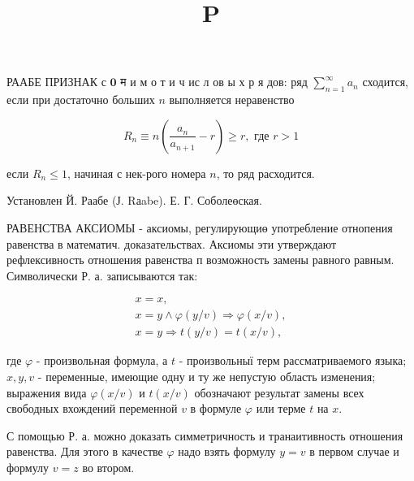 \documentclass[10pt]{article}
\title{$\mathbf{P}$ }
\author{}
\date{}
\begin{document}
\maketitle

РААБЕ ПРИЗНАК с $\mathbf{0}$ म и м о т и ч ис л ов ы х р я дов: ряд $\sum_{n=1}^{\infty} a_{n}$ сходится, если при достаточно больших $n$ выполняется неравенство



\[

R_{n} \equiv n\left(\frac{a_{n}}{a_{n+1}}-r\right) \geqslant r, \text { где } r>1

\]



если $R_{n} \leqslant 1$, начиная с нек-рого номера $n$, то ряд расходится.



Установлен Й. Раабе (Ј. Rаabe). Е. Г. Соболеөская.



РАВЕНСТВА АКСИОМЫ - аксиомы, регулирующиө употребление отнопения равенства в математич. доказательствах. Аксиомы эти утверждают рефлексивность отношения равенства п возможность замены равного равным. Символически Р. а. записываются так:



\[

\begin{gathered}

x=x, \\

x=y \wedge \varphi(y / v) \Rightarrow \varphi(x / v), \\

x=y \Rightarrow t(y / v)=t(x / v),

\end{gathered}

\]



где $\varphi$ - произвольная формула, а $t$ - произвольныї терм рассматриваемого языка; $x, y, v$ - переменные, имеющие одну и ту же непустую область изменения; выражения вида $\varphi(x / v)$ и $t(x / v)$ обозначают результат замены всех свободных вхождений переменной $v$ в формуле $\varphi$ или терме $t$ на $x$.



С помощью Р. а. можно доказать симметричность и транаитивность отношения равенства. Для этого в качестве $\varphi$ надо взять формулу $y=v$ в первом случае и формулу $v=z$ во втором.
\end{document}

